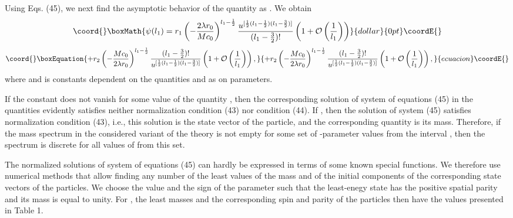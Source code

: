\documentclass[a4paper,12pt]{article}
\begin{document}
Using Eqs. (45), we next find the asymptotic behavior of the quantity 
\coordHE{} as \coordHE{}. We obtain
$$\coord{}\boxMath{\psi (l_{1}) = r_{1}\left( -\frac{2\lambda r_{0}}{Mc_{0}}
\right)^{l_{1}-\frac{1}{2}} 
\frac{u^{[\frac{1}{2}(l_{1}-\frac{1}{2})(l_{1}-\frac{3}{2})]}}
{(l_{1}-\frac{3}{2})!} \left( 1 + 
{\cal O}\left( \frac{1}{l_{1}}\right) \right)}{dollar}{0pt}\coordE{}$$
\begin{equation}\coord{}\boxEquation{
+ r_{2}\left( -\frac{Mc_{0}}{2\lambda r_{0}}
\right)^{l_{1}-\frac{1}{2}} \frac{(l_{1}-\frac{3}{2})!}
{u^{[\frac{1}{2}(l_{1}-\frac{1}{2})(l_{1}-\frac{3}{2})]}}\left( 1 + 
{\cal O}\left( \frac{1}{l_{1}}\right) \right),
}{
+ r_{2}\left( -\frac{Mc_{0}}{2\lambda r_{0}}
\right)^{l_{1}-\frac{1}{2}} \frac{(l_{1}-\frac{3}{2})!}
{u^{[\frac{1}{2}(l_{1}-\frac{1}{2})(l_{1}-\frac{3}{2})]}}\left( 1 + 
{\cal O}\left( \frac{1}{l_{1}}\right) \right),
}{ecuacion}\coordE{}\end{equation}
where \coordHE{} and \coordHE{} is constants dependent on the quantities 
\coordHE{} and \coordHE{} as on parameters.
 
If the constant \coordHE{} does not vanish for some value of the quantity \coordHE{},
then the corresponding solution of system of equations (45) in the quantities
\coordHE{} evidently satisfies neither normalization condition (43) nor
condition (44). If \coordHE{}, then the solution of system (45) satisfies
normalization condition (43), i.e., this solution is the state vector of the
particle, and the corresponding quantity \coordHE{} is its mass. Therefore, if the 
mass spectrum in the considered variant of the theory is not empty for some set
of \coordHE{}-parameter values from the interval \coordHE{}, then the 
spectrum is discrete for all values of \coordHE{} from this set.

The normalized solutions of system of equations (45) can hardly be expressed in
terms of some known special functions. We therefore use numerical methods that
allow finding any number of the least values of the mass \coordHE{} and of the
initial components \coordHE{} of the corresponding state vectors of the
particles. We choose the value and the sign of the parameter 
\coordHE{} such that the least-enegy state has the positive
spatial parity and its mass is equal to unity. For \coordHE{}, the least masses 
\coordHE{} and the corresponding spin and parity \coordHE{} of the particles then have 
the values presented in Table 1.
\end{document}
